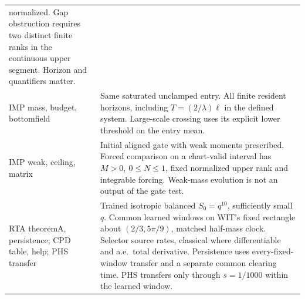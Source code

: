 \documentclass[11pt]{article}
\begin{document}
\begin{longtable}{@{}>{\raggedright\arraybackslash}p{}>{\raggedright\arraybackslash}p{}@{}}
normalized. Gap obstruction requires two distinct finite ranks in
the continuous upper segment. Horizon and quantifiers matter.\\
IMP mass, budget, bottomfield &
Same saturated unclamped entry. All finite resident horizons, including
\(T=(2/\lambda)\ell\) in the defined system. Large-scale crossing
uses its explicit lower threshold on the entry mean.\\
IMP weak, ceiling, matrix &
Initial aligned gate with weak moments prescribed. Forced comparison
on a chart-valid interval has \(M>0,\ 0\le N\le1\), fixed normalized
upper rank and integrable forcing. Weak-mass evolution is not an output
of the gate test.\\
RTA theoremA, persistence; CPD table, help; PHS transfer &
Trained isotropic balanced \(S_0=q^{10}\), sufficiently small \(q\).
Common learned windows on WIT's fixed rectangle about
\((2/3,5\pi/9)\), matched half-mass clock. Selector source rates,
classical where differentiable and a.e.\ total derivative. Persistence
uses every-fixed-window transfer and a separate common clearing time.
PHS transfers only through \(s=1/1000\) within the learned window.\\
\bottomrule
\end{longtable}\normalsize
\end{document}
